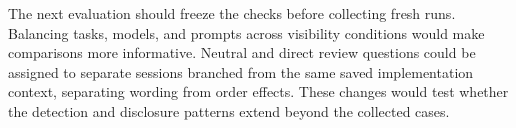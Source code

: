 The next evaluation should freeze the checks before collecting fresh runs.
Balancing tasks, models, and prompts across visibility
conditions would make comparisons more informative. Neutral and direct
review questions could be assigned to separate sessions branched from the
same saved implementation context, separating wording from order effects.
These changes would test whether the detection and disclosure patterns
extend beyond the collected cases.
